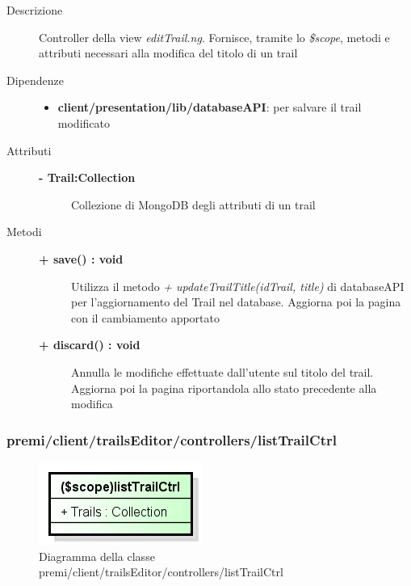 \begin{description}
\item[Descrizione] \hfill
	Controller della view \textit{editTrail.ng}. Fornisce, tramite lo \textit{\$scope}, metodi e attributi necessari alla modifica del titolo di un trail
	
	
\item[Dipendenze] \hfill
	\begin{itemize}
		\item \textbf{client/presentation/lib/databaseAPI}: per salvare il trail modificato
	\end{itemize}
	
	
\item[Attributi] \hfill
	\begin{description}
		\item[\textbf{- Trail:Collection			}] \hfill
			Collezione di MongoDB degli attributi di un trail
	\end{description}
	
\item[Metodi] \hfill

	\begin{description}
		\item[\textbf{\color{blue}+ save() : void			}] \hfill
			Utilizza il metodo \textit{+ updateTrailTitle(idTrail, title)} di databaseAPI per l'aggiornamento del Trail nel database. Aggiorna poi la pagina con il cambiamento apportato
	\end{description}
	
	\begin{description}
		\item[\textbf{\color{blue}+ discard() : void			}] \hfill
			Annulla le modifiche effettuate dall'utente sul titolo del trail. Aggiorna poi la pagina riportandola allo stato precedente alla modifica
	\end{description}

	
\end{description}



\subsubsection{premi/client/trailsEditor/controllers/listTrailCtrl}
\begin{figure}[h]
\begin{center}
\includegraphics[scale=0.55]{img/diacla/listTrailCtrl.png}
\caption{Diagramma della classe premi/client/trailsEditor/controllers/listTrailCtrl}
\end{center}
\end{figure}


